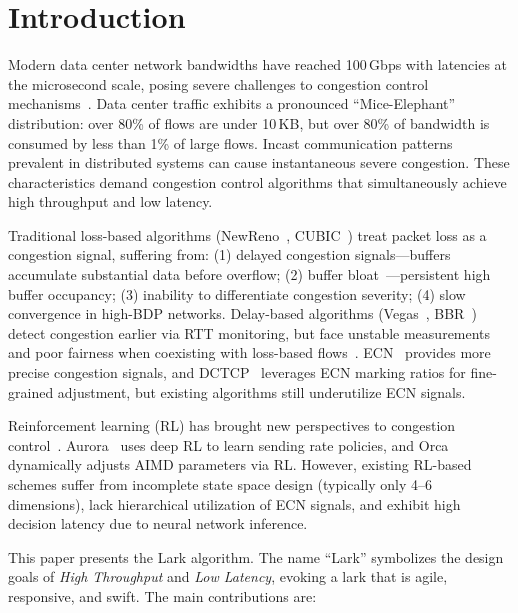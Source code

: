\documentclass[10pt,twocolumn]{article}
\begin{document}
\section{Introduction}

Modern data center network bandwidths have reached 100\,Gbps with latencies at the microsecond scale, posing severe challenges to congestion control mechanisms~\cite{datacentertraffic}. Data center traffic exhibits a pronounced ``Mice-Elephant'' distribution: over 80\% of flows are under 10\,KB, but over 80\% of bandwidth is consumed by less than 1\% of large flows. Incast communication patterns prevalent in distributed systems can cause instantaneous severe congestion. These characteristics demand congestion control algorithms that simultaneously achieve high throughput and low latency.

Traditional loss-based algorithms (NewReno~\cite{newreno}, CUBIC~\cite{cubic}) treat packet loss as a congestion signal, suffering from: (1) delayed congestion signals---buffers accumulate substantial data before overflow; (2) buffer bloat~\cite{bufferbloat}---persistent high buffer occupancy; (3) inability to differentiate congestion severity; (4) slow convergence in high-BDP networks. Delay-based algorithms (Vegas~\cite{vegas}, BBR~\cite{bbr}) detect congestion earlier via RTT monitoring, but face unstable measurements and poor fairness when coexisting with loss-based flows~\cite{bbrfairness}. ECN~\cite{rfc3168} provides more precise congestion signals, and DCTCP~\cite{dctcp} leverages ECN marking ratios for fine-grained adjustment, but existing algorithms still underutilize ECN signals.

Reinforcement learning (RL) has brought new perspectives to congestion control~\cite{rlcc}. Aurora~\cite{aurora} uses deep RL to learn sending rate policies, and Orca~\cite{orca} dynamically adjusts AIMD parameters via RL. However, existing RL-based schemes suffer from incomplete state space design (typically only 4--6 dimensions), lack hierarchical utilization of ECN signals, and exhibit high decision latency due to neural network inference.

This paper presents the Lark algorithm. The name ``Lark'' symbolizes the design goals of \textit{High Throughput} and \textit{Low Latency}, evoking a lark that is agile, responsive, and swift. The main contributions are:
\end{document}
